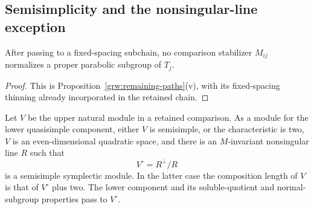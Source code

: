 \subsection{Semisimplicity and the nonsingular-line exception}

\begin{lemma}
\label{pkt:no-parabolic}
After passing to a fixed-spacing subchain, no comparison stabilizer
$M_{ij}$ normalizes a proper parabolic subgroup of $T_j$.
\end{lemma}

\begin{proof}
This is Proposition~\ref{grw:remaining-paths}(v), with its
fixed-spacing thinning already incorporated in the retained chain.
\end{proof}

\begin{lemma}
\label{pkt:semisimple}
Let $V$ be the upper natural module in a retained comparison.
As a module for the lower quasisimple component, either $V$ is
semisimple, or the characteristic is two, $V$ is an even-dimensional
quadratic space, and there is an $M$-invariant nonsingular line
$R$ such that
\[
                  V^{\circ}=R^\perp/R
\]
is a semisimple symplectic module.  In the latter case the
composition length of $V$ is that of $V^{\circ}$ plus two.
The lower component and its soluble-quotient and normal-subgroup
properties pass to $V^{\circ}$.
\end{lemma}

